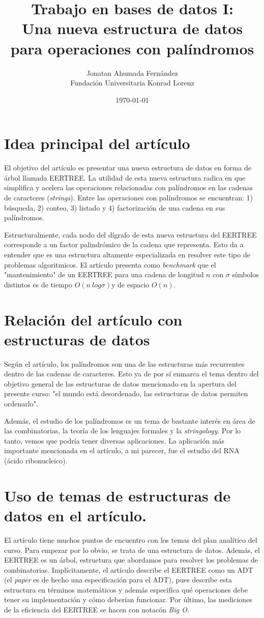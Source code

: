 \documentclass[11pt]{article}
\author{Jonatan Ahumada Fernández\\
Fundación Universitaria Konrad Lorenz}
\date{\today}
\title{Trabajo en bases de datos I:\\
Una nueva estructura de datos para operaciones con palíndromos}
\begin{document}
\maketitle


\section{Idea principal del artículo}
\label{sec-1}
El objetivo del artículo es presentar una nueva estructura de datos en forma de árbol llamada EERTREE. La utilidad
de esta nueva estructura radica en que simplifica y acelera las operaciones relacionadas con palíndromos
en las cadenas de caracteres (\emph{strings}). Entre las operaciones con palíndromos se encuentran: 1) búsqueda, 2) conteo, 3) listado 
y 4) factorización de una cadena en sus palíndromos. 

Estructuralmente, cada nodo del dígrafo de esta nueva estructura del EERTREE corresponde 
a un factor palindrómico de la cadena que representa. Esto da a entender que es una estructura altamente especializada en resolver  este tipo 
de problemas algoritmicos. El artículo presenta como \emph{benchmark} que el "mantenimiento" de un EERTREE para una cadena de longitud \(n\)
con $\sigma$ símbolos distintos es de tiempo  \(O(n\ log\sigma)\)y de espacio \(O(n)\).



\section{ Relación del artículo con estructuras de datos}
\label{sec-2}
Según el artículo, los palíndromos son una de las estructuras más recurrentes dentro de las cadenas de caracteres. 
Esto ya de por sí enmarca el tema dentro del objetivo general de las estructuras de datos mencionado en la
apertura del presente curso: "el mundo está desordenado, las estructuras de datos permiten ordenarlo".

Además, el estudio de los palíndromos es un tema de bastante interés
en área de las combinatorias, la teoría de los lenguajes formales y la \emph{stringology}. Por lo tanto, 
vemos que podría tener diversas aplicaciones. La aplicación más importante mencionada en el artículo, a mi parecer,
fue el estudio del RNA (ácido ribonucleico).  

\section{Uso de temas de estructuras de datos en el artículo.}
\label{sec-3}
El artículo tiene muchos puntos de encuentro con los temas del plan analítico del curso. Para empezar por lo obvio, se 
trata de una estructura de datos. Además, el EERTREE es un árbol, estructura que abordamos para resolver los problemas de 
combinatorias. Implícitamente, el artículo describe el EERTREE como un ADT (el \emph{paper} es de hecho una especificación para el ADT), pues describe esta estructura en términos matemáticos y 
además especifíca qué operaciones debe tener su implementación y cómo deberían funcionar. Por último, las mediciones de la eficiencia 
del EERTREE se hacen con notacón \emph{Big O}.


\nocite{*}
\end{document}
